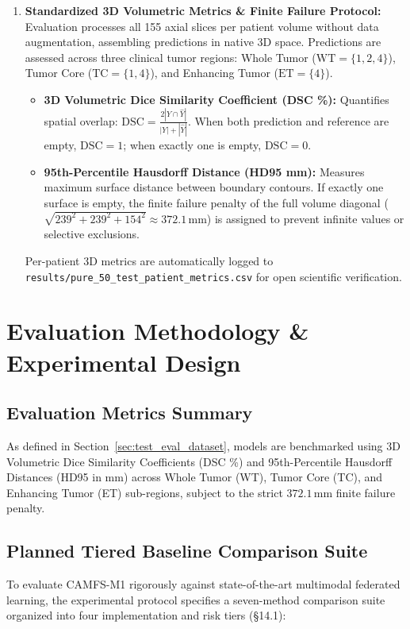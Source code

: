 \documentclass[10pt,a4paper]{article}
\begin{document}
\begin{enumerate}[itemsep=2pt, topsep=2pt]
    \item \textbf{Standardized 3D Volumetric Metrics \& Finite Failure Protocol:}
    Evaluation processes all 155 axial slices per patient volume without data augmentation, assembling predictions in native 3D space. Predictions are assessed across three clinical tumor regions: Whole Tumor ($\text{WT} = \{1, 2, 4\}$), Tumor Core ($\text{TC} = \{1, 4\}$), and Enhancing Tumor ($\text{ET} = \{4\}$).
    \begin{itemize}[itemsep=1pt, topsep=1pt]
        \item \textbf{3D Volumetric Dice Similarity Coefficient (DSC \%):} Quantifies spatial overlap: $\text{DSC} = \frac{2 |Y \cap \hat{Y}|}{|Y| + |\hat{Y}|}$. When both prediction and reference are empty, $\text{DSC} = 1$; when exactly one is empty, $\text{DSC} = 0$.
        \item \textbf{95th-Percentile Hausdorff Distance (HD95 mm):} Measures maximum surface distance between boundary contours. If exactly one surface is empty, the finite failure penalty of the full volume diagonal ($\sqrt{239^2 + 239^2 + 154^2} \approx 372.1\,\text{mm}$) is assigned to prevent infinite values or selective exclusions.
    \end{itemize}
    Per-patient 3D metrics are automatically logged to \texttt{results/pure\_50\_test\_patient\_metrics.csv} for open scientific verification.
\end{enumerate}

\section{Evaluation Methodology \& Experimental Design}

\subsection{Evaluation Metrics Summary}
As defined in Section~\ref{sec:test_eval_dataset}, models are benchmarked using 3D Volumetric Dice Similarity Coefficients (DSC \%) and 95th-Percentile Hausdorff Distances (HD95 in mm) across Whole Tumor (WT), Tumor Core (TC), and Enhancing Tumor (ET) sub-regions, subject to the strict $372.1\,\text{mm}$ finite failure penalty.

\subsection{Planned Tiered Baseline Comparison Suite}
To evaluate CAMFS-M1 rigorously against state-of-the-art multimodal federated learning, the experimental protocol specifies a seven-method comparison suite organized into four implementation and risk tiers (\S14.1):
\end{document}
